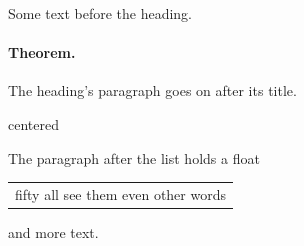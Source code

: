 \documentclass{article}
\begin{document}
Some text before the heading.

\paragraph{Theorem.} The heading's paragraph goes on after its title.
\begin{center}
centered
\end{center}
The paragraph after the list holds a float
\begin{table}[!b]
\begin{tabular}{p{2cm}}
fifty all see them even other words
\end{tabular}
\end{table}
and more text.
\end{document}
